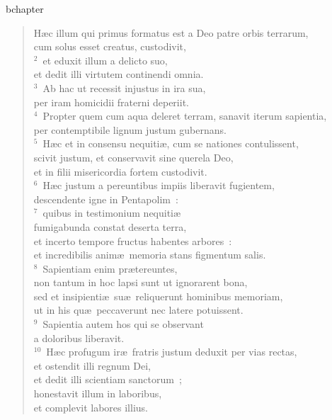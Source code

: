 bchapter\begin{flushleft}\begin{verse}\vspace{-19pt}\hspace{6pt}H\ae c illum qui primus formatus est a Deo patre orbis terrarum,\\\hspace{6pt} cum solus esset creatus, custodivit,\\
${}^{2}$~et eduxit illum a delicto suo,\\ et dedit illi virtutem continendi omnia.\\
${}^{3}$~Ab hac ut recessit injustus in ira sua,\\ per iram homicidii fraterni deperiit.\\
${}^{4}$~Propter quem cum aqua deleret terram, sanavit iterum sapientia,\\ per contemptibile lignum justum gubernans.\\
${}^{5}$~H\ae c et in consensu nequiti\ae , cum se nationes contulissent,\\ scivit justum, et conservavit sine querela Deo,\\ et in filii misericordia fortem custodivit.\\
${}^{6}$~H\ae c justum a pereuntibus impiis liberavit fugientem,\\ descendente igne in Pentapolim~:\\
${}^{7}$~quibus in testimonium nequiti\ae \\ fumigabunda constat deserta terra,\\ et incerto tempore fructus habentes arbores~:\\ et incredibilis anim\ae\ memoria stans figmentum salis.\\
${}^{8}$~Sapientiam enim pr\ae tereuntes,\\ non tantum in hoc lapsi sunt ut ignorarent bona,\\ sed et insipienti\ae\ su\ae\ reliquerunt hominibus memoriam,\\ ut in his qu\ae\ peccaverunt nec latere potuissent.\\
${}^{9}$~Sapientia autem hos qui se observant\\ a doloribus liberavit.\\
${}^{10}$~H\ae c profugum ir\ae\ fratris justum deduxit per vias rectas,\\ et ostendit illi regnum Dei,\\ et dedit illi scientiam sanctorum~;\\ honestavit illum in laboribus,\\ et complevit labores illius.\\

\end{verse}
\end{flushleft}
